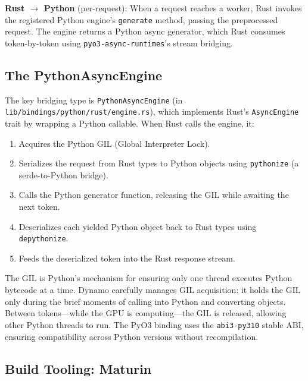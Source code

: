 \textbf{Rust $\rightarrow$ Python} (per-request): When a request reaches a worker, Rust invokes the registered Python engine's \texttt{generate} method, passing the preprocessed request. The engine returns a Python async generator, which Rust consumes token-by-token using \texttt{pyo3-async-runtimes}'s stream bridging.

\subsection{The PythonAsyncEngine}

The key bridging type is \texttt{PythonAsyncEngine} (in \texttt{lib/bindings/python/rust/engine.rs}), which implements Rust's \texttt{AsyncEngine} trait by wrapping a Python callable. When Rust calls the engine, it:

\begin{enumerate}
%
  \item Acquires the Python GIL (Global Interpreter Lock).
  \item Serializes the request from Rust types to Python objects using \texttt{pythonize} (a serde-to-Python bridge).
  \item Calls the Python generator function, releasing the GIL while awaiting the next token.
  \item Deserializes each yielded Python object back to Rust types using \texttt{depythonize}.
  \item Feeds the deserialized token into the Rust response stream.
\end{enumerate}

\begin{notebox}
The GIL is Python's mechanism for ensuring only one thread executes Python bytecode at a time. Dynamo carefully manages GIL acquisition: it holds the GIL only during the brief moments of calling into Python and converting objects. Between tokens---while the GPU is computing---the GIL is released, allowing other Python threads to run. The PyO3 binding uses the \texttt{abi3-py310} stable ABI, ensuring compatibility across Python versions without recompilation.
\end{notebox}

\subsection{Build Tooling: Maturin}

